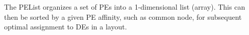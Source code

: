 
The PEList organizes a set of PEs into a 1-dimensional list (array).  This can
then be sorted by a given PE affinity, such as common node, for subsequent
optimal assignment to DEs in a layout.

